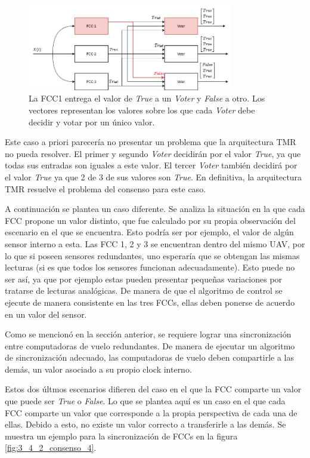\begin{figure}[H]
    \centering
    \includegraphics[width=0.8\textwidth]{img/3_4_2_consenso_2.png}
    \caption{La FCC1 entrega el valor de \textit{True} a un \textit{Voter} y \textit{False} a otro. Los vectores representan los valores sobre los que cada \textit{Voter} debe decidir y votar por un único valor.}
    \label{fig:3_4_2_consenso_2}
\end{figure}

Este caso a priori parecería no presentar un problema que la arquitectura TMR no pueda resolver. El primer y segundo \textit{Voter} decidirán por el valor \textit{True}, ya que todas sus entradas son iguales a este valor. El tercer \textit{Voter} también decidirá por el valor \textit{True} ya que 2 de 3 de sus valores son \textit{True}. En definitiva, la arquitectura TMR resuelve el problema del consenso para este caso.

A continuación se plantea un caso diferente. Se analiza la situación en la que cada FCC propone un valor distinto, que fue calculado por su propia observación del escenario en el que se encuentra. Esto podría ser por ejemplo, el valor de algún sensor interno a esta. Las FCC 1, 2 y 3 se encuentran dentro del mismo UAV, por lo que si poseen sensores redundantes, uno esperaría que se obtengan las mismas lecturas (si es que todos los sensores funcionan adecuadamente). Esto puede no ser así, ya que por ejemplo estas pueden presentar pequeñas variaciones por tratarse de lecturas analógicas. De manera de que el algoritmo de control se ejecute de manera consistente en las tres FCCs, ellas deben ponerse de acuerdo en un valor del sensor.

Como se mencionó en la sección anterior, se requiere lograr una sincronización entre computadoras de vuelo redundantes. De manera de ejecutar un algoritmo de sincronización adecuado, las computadoras de vuelo deben compartirle a las demás, un valor asociado a su propio clock interno.

Estos dos últmos escenarios difieren del caso en el que la FCC comparte un valor que puede ser \textit{True} o \textit{False}. Lo que se plantea aquí es un caso en el que cada FCC comparte un valor que corresponde a la propia perspectiva de cada una de ellas. Debido a esto, no existe un valor correcto a transferirle a las demás. Se muestra un ejemplo para la sincronización de FCCs en la figura \ref{fig:3_4_2_consenso_4}.

